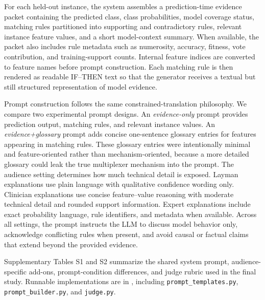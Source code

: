 \documentclass[sigconf]{acmart}
\begin{document}
For each held-out instance, the system assembles a prediction-time evidence packet containing the predicted class, class probabilities, model coverage status, matching rules partitioned into supporting and contradictory rules, relevant instance feature values, and a short model-context summary. When available, the packet also includes rule metadata such as numerosity, accuracy, fitness, vote contribution, and training-support counts. Internal feature indices are converted to feature names before prompt construction. Each matching rule is then rendered as readable IF--THEN text so that the generator receives a textual but still structured representation of model evidence.

Prompt construction follows the same constrained-translation philosophy. We compare two experimental prompt designs. An \emph{evidence-only} prompt provides prediction output, matching rules, and relevant instance values. An \emph{evidence+glossary} prompt adds concise one-sentence glossary entries for features appearing in matching rules. These glossary entries were intentionally minimal and feature-oriented rather than mechanism-oriented, because a more detailed glossary could leak the true multiplexer mechanism into the prompt. The audience setting determines how much technical detail is exposed. Layman explanations use plain language with qualitative confidence wording only. Clinician explanations use concise feature--value reasoning with moderate technical detail and rounded support information. Expert explanations include exact probability language, rule identifiers, and metadata when available. Across all settings, the prompt instructs the LLM to discuss model behavior only, acknowledge conflicting rules when present, and avoid causal or factual claims that extend beyond the provided evidence.

Supplementary Tables S1 and S2 summarize the shared system prompt, audience-specific add-ons, prompt-condition differences, and judge rubric used in the final study. Runnable implementations are in , including \texttt{prompt\_templates.py}, \texttt{prompt\_builder.py}, and \texttt{judge.py}.
\end{document}
